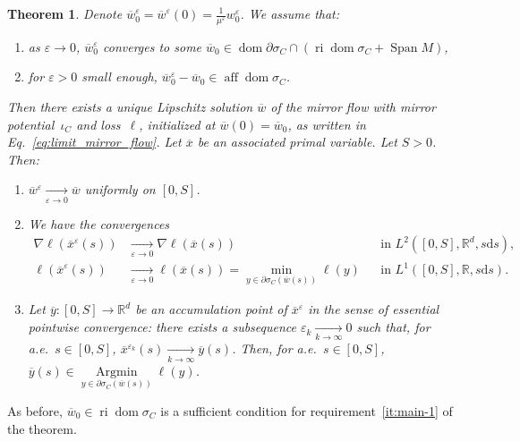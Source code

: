 \documentclass[11pt,english,reqno]{article}
\DeclareMathOperator{\Span}{Span}
\DeclareMathOperator{\dom}{dom}
\DeclareMathOperator{\Argmin}{Argmin}
\DeclareMathOperator{\ri}{ri}
\DeclareMathOperator{\aff}{aff}
\newcommand{\diff}{\mathrm{d}}
\newcommand{\R}{\mathbb{R}}
\theoremstyle{plain}
\newtheorem{thm}[proposition]{Theorem}
\theoremstyle{definition}
\theoremstyle{remark}
\numberwithin{equation}{section}
\begin{document}
\begin{thm}
	\label{thm:main}
	Denote $\overline{w}_0^\varepsilon = \overline{w}^\varepsilon(0) = \frac{1}{\mu^\varepsilon} w^\varepsilon_0$. We assume that:
	\begin{enumerate}[label=(\roman*)]
		\item\label{it:main-1} as $\varepsilon \to 0$, $\overline{w}^\varepsilon_0$ converges to some $\overline{w}_0 \in \dom \partial \sigma_C \cap \left(\ri \dom \sigma_C + \Span M\right)$, 
		\item\label{it:main-2} for $\varepsilon > 0$ small enough, $\overline{w}_0^\varepsilon - \overline{w}_0 \in \aff \dom \sigma_C$.
	\end{enumerate}
	Then there exists a unique Lipschitz solution $\overline{w}$ of the mirror flow with mirror potential~$\iota_C$ and loss~$\ell$, initialized at $\overline{w}(0) = \overline{w}_0$, as written in Eq.~\eqref{eq:limit_mirror_flow}. Let $\overline{x}$ be an associated primal variable. Let $S > 0$. Then:
	\begin{enumerate}[label=(\alph*)]
		\item\label{it:main-statement-1} $\overline{w}^\varepsilon \xrightarrow[\varepsilon\to 0]{} \overline{w}$ uniformly on $[0,S]$.
		\item \label{it:main-statement-2} We have the convergences
		\begin{align*}
			\nabla \ell(\overline{x}^\varepsilon(s))
			&\xrightarrow[\varepsilon\to 0]{}
			\nabla \ell(\overline{x}(s))
			&&\text{in } L^2([0,S],\R^d, s\diff s),\\
			\ell(\overline{x}^\varepsilon(s))
			&\xrightarrow[\varepsilon\to 0]{}
			\ell(\overline{x}(s))
			= \min_{y \in \partial \sigma_C(\overline{w}(s))} \ell(y)
			&&\text{in } L^1([0,S],\R, s\diff s).
		\end{align*}
		\item Let $\overline{y}:[0,S]\to\R^d$ be an accumulation point of $\overline{x}^\varepsilon$ in the sense of essential pointwise convergence: there exists a subsequence $\varepsilon_k \xrightarrow[k\to\infty]{} 0$ such that, for a.e.~$s \in [0,S]$, $\overline{x}^{\varepsilon_k}(s) \xrightarrow[k\to\infty]{} \overline{y}(s)$. Then, for a.e.~$s \in [0,S]$, $\overline{y}(s) \in \underset{y \in \partial \sigma_C(\overline{w}(s))}{\Argmin} \ell(y)$.
	\end{enumerate}
\end{thm}

As before, $\overline{w}_0 \in \ri \dom \sigma_C$ is a sufficient condition for requirement~\ref{it:main-1} of the theorem.
\end{document}
